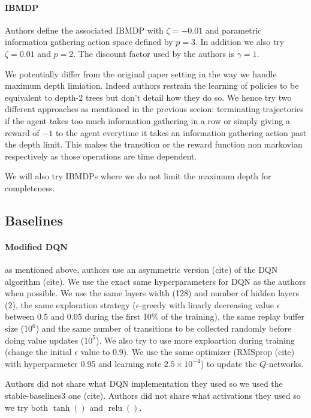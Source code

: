 \paragraph{IBMDP} Authors define the associated IBMDP with $\zeta=-0.01$ and parametric information gathering action space defined by $p=3$.
In addition we also try $\zeta=0.01$ and $p=2$.
The discount factor used by the authors is $\gamma=1$.

We potentially differ from the original paper setting in the way we handle maximum depth limiation. 
Indeed authors restrain the learning of policies to be equivalent to depth-2 trees but don't detail how they do so.
We hence try two different approaches as mentioned in the previous secion: terminating trajectories if the agent takes too much information gathering in a row or simply giving a reward of $-1$ to the agent everytime it takes an information gathering action past the depth limit.
This makes the transition or the reward function non markovian respectively as those operations are time dependent.

We will also try IBMDPs where we do not limit the maximum depth for completeness.

\subsection{Baselines}
\paragraph{Modified DQN} as mentioned above, authors use an asymmetric version (cite) of the DQN algorithm (cite).
We use the exact same hyperparameters for DQN as the authors when possible. 
We use the same layers width (128) and number of hidden layers (2), the same exploration strategy ($\epsilon$-greedy with linarly decreasing value $\epsilon$ between 0.5 and 0.05 during the first 10\% of the training),
the same replay buffer size ($10^6$) and the same number of transitions to be collected randomly before doing value updates ($10^5$).
We also try to use more exploartion during training (change the initial $\epsilon$ value to 0.9).
We use the same optimizer (RMSprop (cite) with hyperparmeter 0.95 and learning rate $2.5 \times 10^{-4}$) to update the $Q$-networks.

Authors did not share what DQN implementation they used so we used the stable-baselines3 one (cite).
Authors did not share what activations they used so we try both $\operatorname{tanh}()$ and $\operatorname{relu}()$. 

